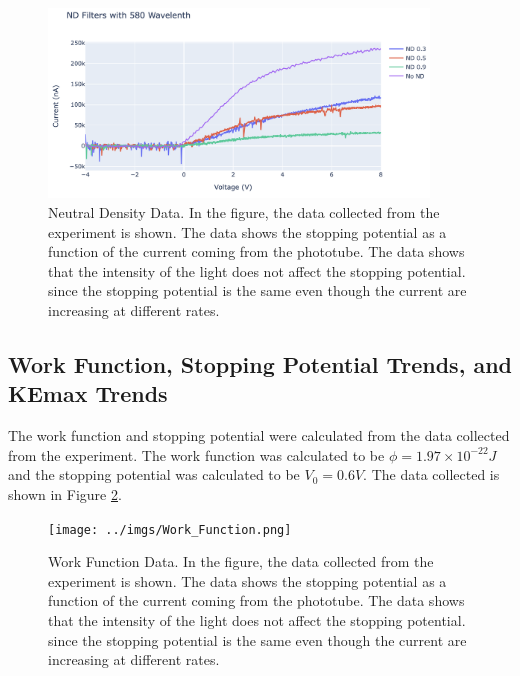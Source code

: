 \documentclass[12pt]{article}
\begin{document}
        \begin{figure}[!h]
                \centering
                \includegraphics[width=0.9\textwidth]{../imgs/ND580.png}
                \caption{Neutral Density Data. In the figure, the data collected from the experiment is shown. The data shows the 
                stopping potential as a function of the current coming from the phototube. The data shows that the intensity of the light
                does not affect the stopping potential. since the stopping potential is the same even though the current
                are increasing at different rates.}
                \label{fig: ND Data}
        \end{figure}

        \subsection{Work Function, Stopping Potential Trends, and KEmax Trends}
        The work function and stopping potential were calculated from the data collected from the experiment. The work function
        was calculated to be \( \phi = 1.97 \times 10^{-22} J \) and the stopping potential was calculated to be \( V_0 = 0.6 V \).
        The data collected is shown in Figure \ref{fig: Work Function Data}.

        \begin{figure}[!h]
                \centering
                \texttt{[image: ../imgs/Work\_Function.png]}
                \caption{Work Function Data. In the figure, the data collected from the experiment is shown. The data shows the 
                stopping potential as a function of the current coming from the phototube. The data shows that the intensity of the light
                does not affect the stopping potential. since the stopping potential is the same even though the current
                are increasing at different rates.}
                \label{fig: Work Function Data}
        \end{figure}
\end{document}
